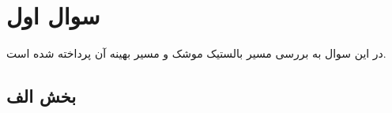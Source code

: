 \section{سوال اول}
در این سوال به بررسی مسیر بالستیک موشک و مسیر بهینه آن پرداخته شده است.
\subsection{بخش الف}